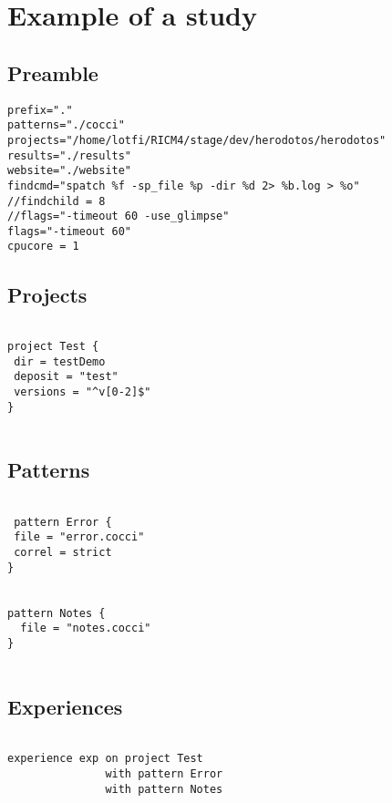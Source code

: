 \chapter{Example of a study}
\label{sec:study}

\section{Preamble}
\label{sec:ex-preamble}

\begin{lstlisting}
prefix="."
patterns="./cocci"
projects="/home/lotfi/RICM4/stage/dev/herodotos/herodotos"
results="./results"
website="./website"
findcmd="spatch %f -sp_file %p -dir %d 2> %b.log > %o"
//findchild = 8
//flags="-timeout 60 -use_glimpse"
flags="-timeout 60"
cpucore = 1
\end{lstlisting}

\section{Projects}
\label{sec:ex-projects}


\begin{lstlisting}
 
project Test {
 dir = testDemo	
 deposit = "test"
 versions = "^v[0-2]$"       
}
 
\end{lstlisting}


\section{Patterns}
\label{sec:ex-patterns}


\begin{lstlisting}
 
 pattern Error {
 file = "error.cocci"
 correl = strict
}


pattern Notes {
  file = "notes.cocci"
}
 
\end{lstlisting}

\section{Experiences}
\label{sec:ex-experiences}


\begin{lstlisting}

experience exp on project Test 
               with pattern Error
               with pattern Notes	

\end{lstlisting}



